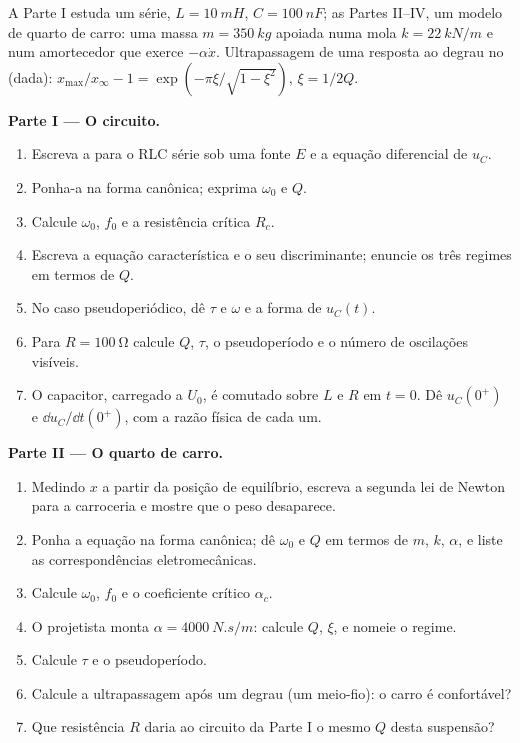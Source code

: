 \begin{problem}
\label{pb:b1:transient-regimes:1}
A Parte I estuda um  série, $L = \qty{10}{mH}$, $C = \qty{100}{nF}$;
as Partes II--IV, um modelo de quarto de carro: uma massa $m = \qty{350}{kg}$ apoiada numa
mola $k = \qty{22}{kN/m}$ e num amortecedor que exerce $-\alpha\dot x$.
Ultrapassagem de uma resposta ao degrau no  (dada):
$x_{\max}/x_\infty - 1 = \exp(-\pi\xi/\sqrt{1 - \xi^2})$, $\xi = 1/2Q$.

\medskip
\noindent\textbf{Parte I --- O circuito.}
\begin{enumerate}
  \item Escreva a  para o RLC série sob uma fonte $E$ e a
        equação diferencial de $u_C$.
  \item Ponha-a na forma canônica; exprima $\omega_0$ e $Q$.
  \item Calcule $\omega_0$, $f_0$ e a resistência crítica $R_c$.
  \item Escreva a equação característica e o seu discriminante; enuncie
        os três regimes em termos de $Q$.
  \item No caso pseudoperiódico, dê $\tau$ e $\omega$ e a
        forma de $u_C(t)$.
  \item Para $R = \qty{100}{\ohm}$ calcule $Q$, $\tau$, o pseudoperíodo
        e o número de oscilações visíveis.
  \item O capacitor, carregado a $U_0$, é comutado sobre $L$ e $R$
        em $t = 0$. Dê $u_C(0^+)$ e $\dd u_C/\dd t(0^+)$, com a
        razão física de cada um.
\end{enumerate}

\medskip
\noindent\textbf{Parte II --- O quarto de carro.}
\begin{enumerate}[resume]
  \item Medindo $x$ a partir da posição de equilíbrio, escreva a segunda
        lei de Newton para a carroceria e mostre que o peso desaparece.
  \item Ponha a equação na forma canônica; dê $\omega_0$ e $Q$ em
        termos de $m$, $k$, $\alpha$, e liste as correspondências
        eletromecânicas.
  \item Calcule $\omega_0$, $f_0$ e o coeficiente crítico
        $\alpha_c$.
  \item O projetista monta $\alpha = \qty{4000}{N.s/m}$: calcule $Q$,
        $\xi$, e nomeie o regime.
  \item Calcule $\tau$ e o pseudoperíodo.
  \item Calcule a ultrapassagem após um degrau (um meio-fio): o carro é
        confortável?
  \item Que resistência $R$ daria ao circuito da Parte I o mesmo
        $Q$ desta suspensão?
\end{enumerate}


\end{problem}
